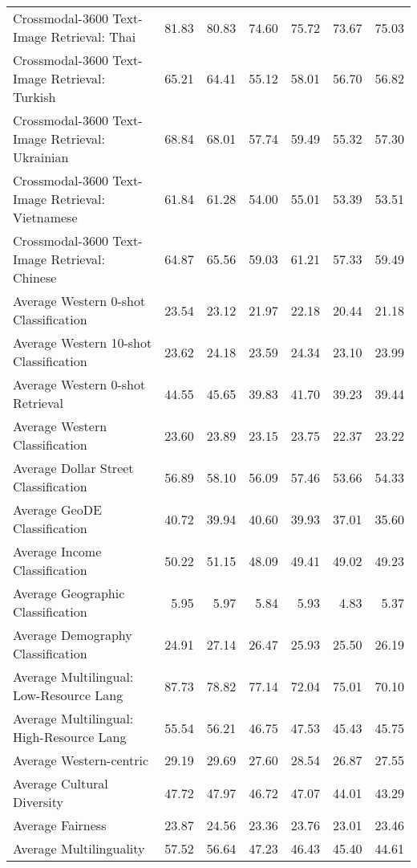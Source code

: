 {\begin{longtable}{l|rr|rr|rr}
Crossmodal-3600 Text-Image Retrieval: Thai & 81.83 & 80.83 & 74.60 & 75.72 & 73.67 & 75.03 \\
Crossmodal-3600 Text-Image Retrieval: Turkish & 65.21 & 64.41 & 55.12 & 58.01 & 56.70 & 56.82 \\
Crossmodal-3600 Text-Image Retrieval: Ukrainian & 68.84 & 68.01 & 57.74 & 59.49 & 55.32 & 57.30 \\
Crossmodal-3600 Text-Image Retrieval: Vietnamese & 61.84 & 61.28 & 54.00 & 55.01 & 53.39 & 53.51 \\
Crossmodal-3600 Text-Image Retrieval: Chinese & 64.87 & 65.56 & 59.03 & 61.21 & 57.33 & 59.49 \\
Average Western 0-shot Classification & 23.54 & 23.12 & 21.97 & 22.18 & 20.44 & 21.18 \\
Average Western 10-shot Classification & 23.62 & 24.18 & 23.59 & 24.34 & 23.10 & 23.99 \\
Average Western 0-shot Retrieval & 44.55 & 45.65 & 39.83 & 41.70 & 39.23 & 39.44 \\
Average Western Classification & 23.60 & 23.89 & 23.15 & 23.75 & 22.37 & 23.22 \\
Average Dollar Street Classification & 56.89 & 58.10 & 56.09 & 57.46 & 53.66 & 54.33 \\
Average GeoDE Classification & 40.72 & 39.94 & 40.60 & 39.93 & 37.01 & 35.60 \\
Average Income Classification & 50.22 & 51.15 & 48.09 & 49.41 & 49.02 & 49.23 \\
Average Geographic Classification & 5.95 & 5.97 & 5.84 & 5.93 & 4.83 & 5.37 \\
Average Demography Classification & 24.91 & 27.14 & 26.47 & 25.93 & 25.50 & 26.19 \\
Average Multilingual: Low-Resource Lang & 87.73 & 78.82 & 77.14 & 72.04 & 75.01 & 70.10 \\
Average Multilingual: High-Resource Lang & 55.54 & 56.21 & 46.75 & 47.53 & 45.43 & 45.75 \\
Average Western-centric & 29.19 & 29.69 & 27.60 & 28.54 & 26.87 & 27.55 \\
Average Cultural Diversity & 47.72 & 47.97 & 46.72 & 47.07 & 44.01 & 43.29 \\
Average Fairness & 23.87 & 24.56 & 23.36 & 23.76 & 23.01 & 23.46 \\
Average Multilinguality & 57.52 & 56.64 & 47.23 & 46.43 & 45.40 & 44.61 \\

\end{longtable}
}